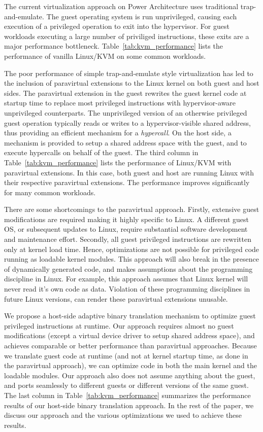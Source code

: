 \documentclass[10pt,twocolumn]{article}
\begin{document}
The current virtualization approach on Power Architecture uses traditional
trap-and-emulate. The guest operating system is run unprivileged, causing each
execution of a privileged
operation to exit into the hypervisor. For guest workloads executing a large number
of priviliged instructions, these exits are a major performance
bottleneck. Table~\ref{tab:kvm_performance} lists the performance of vanilla Linux/KVM
on some common workloads.

The poor performance of simple trap-and-emulate style virtualization has led to
the inclusion of paravirtual extensions to the Linux kernel on both
guest and host sides. The paravirtual extension in the guest rewrites the guest kernel
code at startup time to replace most privileged instructions with
hypervisor-aware unprivileged counterparts. The unprivileged version of an
otherwise privileged guest operation typically reads or writes to a hypervisor-visible
shared address, thus providing an efficient mechanism for a {\em hypercall}.
On the host side, a mechanism is provided to setup a shared address space with the guest,
and to execute hypercalls on behalf of the guest. The third column in
Table~\ref{tab:kvm_performance} lists the performance of Linux/KVM with paravirtual
extensions. In this case, both guest and host are running Linux with their respective
paravirtual extensions. The performance improves significantly for many common
workloads.

There are some shortcomings to the paravirtual approach. Firstly, extensive guest
modifications are required making it highly specific to Linux. A different
guest OS, or subsequent updates to Linux, require substantial software
development and maintenance effort. Secondly, all guest
privileged instructions are rewritten only at kernel load time. Hence,
optimizations are
not possible for privileged code running as loadable kernel modules. This
approach will also break in the presence of dynamically generated code, and makes
assumptions about the programming discipline in Linux. For example, this approach
assumes that Linux kernel will never read it's own code as data. Violation of
these programming disciplines in future Linux versions, can render these paravirtual
extensions unusable.

We propose a host-side adaptive binary translation mechanism to optimize guest
privileged instructions at runtime. Our approach requires almost no guest modifications
(except a virtual device driver to setup shared address space), and achieves
comparable or better performance than paravirtual approaches. Because we translate
guest code at runtime (and not at kernel startup time, as done in the paravirtual
approach), we
can optimize code in both the main kernel and the loadable modules. Our approach also
does not assume anything about the guest, and ports seamlessly to different
guests or different versions of the same guest.
The last column in Table~\ref{tab:kvm_performance} summarizes the performance results of
our host-side binary translation approach. In the rest of the paper, we discuss
our approach and the various optimizations we used to achieve these results.
\end{document}
